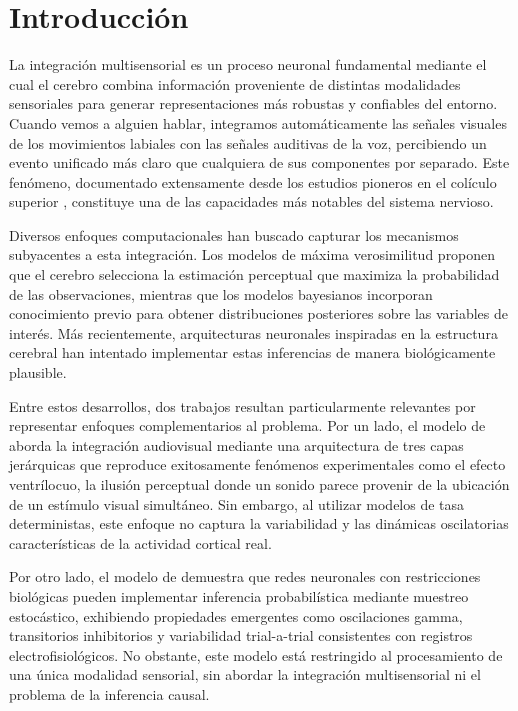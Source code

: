 \chapter{Introducción}
\label{chapter:intro}

La integración multisensorial es un proceso neuronal fundamental mediante el cual el cerebro combina información proveniente de distintas modalidades sensoriales para generar representaciones más robustas y confiables del entorno. Cuando vemos a alguien hablar, integramos automáticamente las señales visuales de los movimientos labiales con las señales auditivas de la voz, percibiendo un evento unificado más claro que cualquiera de sus componentes por separado. Este fenómeno, documentado extensamente desde los estudios pioneros en el colículo superior \citep{stein2012new}, constituye una de las capacidades más notables del sistema nervioso.

Diversos enfoques computacionales han buscado capturar los mecanismos subyacentes a esta integración. Los modelos de máxima verosimilitud proponen que el cerebro selecciona la estimación perceptual que maximiza la probabilidad de las observaciones, mientras que los modelos bayesianos incorporan conocimiento previo para obtener distribuciones posteriores sobre las variables de interés. Más recientemente, arquitecturas neuronales inspiradas en la estructura cerebral han intentado implementar estas inferencias de manera biológicamente plausible.

Entre estos desarrollos, dos trabajos resultan particularmente relevantes por representar enfoques complementarios al problema. Por un lado, el modelo de \citet{cuppini2017biologically} aborda la integración audiovisual mediante una arquitectura de tres capas jerárquicas que reproduce exitosamente fenómenos experimentales como el efecto ventrílocuo, la ilusión perceptual donde un sonido parece provenir de la ubicación de un estímulo visual simultáneo. Sin embargo, al utilizar modelos de tasa deterministas, este enfoque no captura la variabilidad y las dinámicas oscilatorias características de la actividad cortical real.

Por otro lado, el modelo de \citet{echeveste2020cortical} demuestra que redes neuronales con restricciones biológicas pueden implementar inferencia probabilística mediante muestreo estocástico, exhibiendo propiedades emergentes como oscilaciones gamma, transitorios inhibitorios y variabilidad trial-a-trial consistentes con registros electrofisiológicos. No obstante, este modelo está restringido al procesamiento de una única modalidad sensorial, sin abordar la integración multisensorial ni el problema de la inferencia causal.

